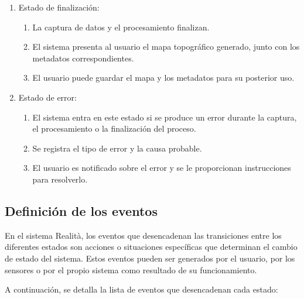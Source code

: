 \documentclass[12pt,a4paper, twoside]{article} %
\begin{document}
\begin{enumerate}
\item Estado de finalización:

\begin{enumerate}
    \item La captura de datos y el procesamiento finalizan.
    \item El sistema presenta al usuario el mapa topográfico generado, junto con los metadatos correspondientes.
    \item El usuario puede guardar el mapa y los metadatos para su posterior uso.
\end{enumerate}

\item Estado de error:

\begin{enumerate}
    \item El sistema entra en este estado si se produce un error durante la captura, el procesamiento o la finalización del proceso.
    \item Se registra el tipo de error y la causa probable.
    \item El usuario es notificado sobre el error y se le proporcionan instrucciones para resolverlo.
\end{enumerate}

\end{enumerate}

\subsection{Definición de los eventos}
\label{sec:descripcion-general}

En el sistema Realità, los eventos que desencadenan las transiciones entre los diferentes estados son acciones o situaciones específicas que determinan el cambio de estado del sistema. Estos eventos pueden ser generados por el usuario, por los sensores o por el propio sistema como resultado de su funcionamiento.

A continuación, se detalla la lista de eventos que desencadenan cada estado:
\end{document}
